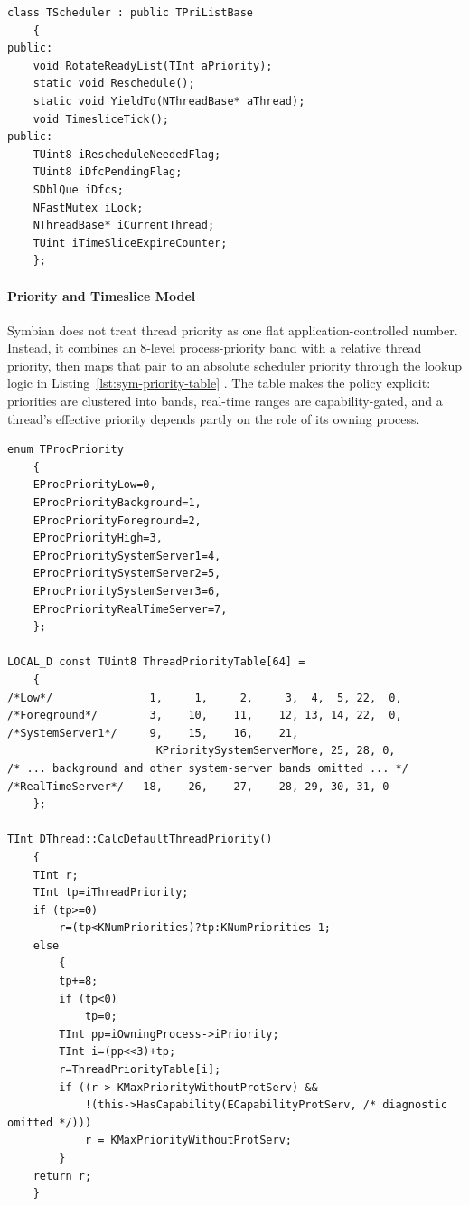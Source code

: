 \begin{listing}[H]
\begin{verbatim}
class TScheduler : public TPriListBase
	{
public:
	void RotateReadyList(TInt aPriority);
	static void Reschedule();
	static void YieldTo(NThreadBase* aThread);
	void TimesliceTick();
public:
	TUint8 iRescheduleNeededFlag;
	TUint8 iDfcPendingFlag;
	SDblQue iDfcs;
	NFastMutex iLock;
	NThreadBase* iCurrentThread;
	TUint iTimeSliceExpireCounter;
	};
\end{verbatim}
\caption{Core scheduler state in \texttt{nk\_priv.h}.}
\label{lst:sym-tscheduler}
\end{listing}

\paragraph{Priority and Timeslice Model}

Symbian does not treat thread priority as one flat application-controlled
number. Instead, it combines an 8-level process-priority band with a relative
thread priority, then maps that pair to an absolute scheduler priority through
the lookup logic in Listing~\ref{lst:sym-priority-table}
\citep{symbian_eka2_kernel}. The table makes the policy explicit: priorities
are clustered into bands, real-time ranges are capability-gated, and a
thread's effective priority depends partly on the role of its owning process.

\begin{listing}[H]
\begin{verbatim}
enum TProcPriority
	{
	EProcPriorityLow=0,
	EProcPriorityBackground=1,
	EProcPriorityForeground=2,
	EProcPriorityHigh=3,
	EProcPrioritySystemServer1=4,
	EProcPrioritySystemServer2=5,
	EProcPrioritySystemServer3=6,
	EProcPriorityRealTimeServer=7,
	};

LOCAL_D const TUint8 ThreadPriorityTable[64] =
	{
/*Low*/               1,     1,     2,     3,  4,  5, 22,  0,
/*Foreground*/        3,    10,    11,    12, 13, 14, 22,  0,
/*SystemServer1*/     9,    15,    16,    21,
                       KPrioritySystemServerMore, 25, 28, 0,
/* ... background and other system-server bands omitted ... */
/*RealTimeServer*/   18,    26,    27,    28, 29, 30, 31, 0
	};

TInt DThread::CalcDefaultThreadPriority()
	{
	TInt r;
	TInt tp=iThreadPriority;
	if (tp>=0)
		r=(tp<KNumPriorities)?tp:KNumPriorities-1;
	else
		{
		tp+=8;
		if (tp<0)
			tp=0;
		TInt pp=iOwningProcess->iPriority;
		TInt i=(pp<<3)+tp;
		r=ThreadPriorityTable[i];
		if ((r > KMaxPriorityWithoutProtServ) &&
			!(this->HasCapability(ECapabilityProtServ, /* diagnostic omitted */)))
			r = KMaxPriorityWithoutProtServ;
		}
	return r;
	}
\end{verbatim}
\caption{Process-priority bands and thread-priority mapping. Files:
\texttt{kern\_priv.h} and \texttt{sthread.cpp}.}
\label{lst:sym-priority-table}
\end{listing}


